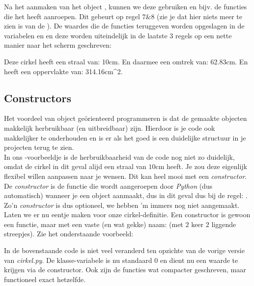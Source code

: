 Na het aanmaken van het object , kunnen we deze gebruiken en bijv. de functies die het heeft aanroepen. Dit gebeurt op regel $7 \& 8$ (zie je dat hier niets meer te zien is van de ). De waardes die de functies teruggeven worden opgeslagen in de variabelen  en  en deze worden uiteindelijk in de laatste $3$ regels op een nette manier naar het scherm geschreven: \\ 

\begin{python}
Deze cirkel heeft een straal van: 10cm.
En daarmee een omtrek van: 62.83cm.
En heeft een oppervlakte van: 314.16cm^2.
\end{python}

\newpage

\subsection{Constructors}
Het voordeel van object geörienteerd programmeren is dat de gemaakte objecten makkelijk herbruikbaar (en uitbreidbaar) zijn. Hierdoor is je code ook makkelijker te onderhouden en is er als het goed is een duidelijke structuur in je projecten terug te zien. \\

In ons -voorbeeldje is de herbruikbaarheid van de code nog niet zo duidelijk, omdat de cirkel in dit geval alijd een straal van $10$cm heeft. Je zou deze eigenlijk flexibel willen aanpassen naar je wensen. Dit kan heel mooi met een \textit{constructor}. De \textit{constructor} is de functie die wordt aangeroepen door \textit{Python} (dus automatisch) wanneer je een object aanmaakt, dus in dit geval dus bij de regel:  . \\ 

Zo'n \textit{constructor} is dus optioneel, we hebben 'm immers nog niet aangemaakt. Laten we er nu eentje maken voor onze cirkel-definitie. Een constructor is gewoon een functie, maar met een vaste (en wat gekke) naam:  (met $2$ keer $2$ liggende streepjes). Zie het onderstaande voorbeeld:


In de bovenstaande code is niet veel veranderd ten opzichte van de vorige versie van \textit{cirkel.py}. De klasse-variabele  is nu standaard $0$ en dient nu een waarde te krijgen via de constructor. Ook zijn de functies wat compacter geschreven, maar functioneel exact hetzelfde. \\

